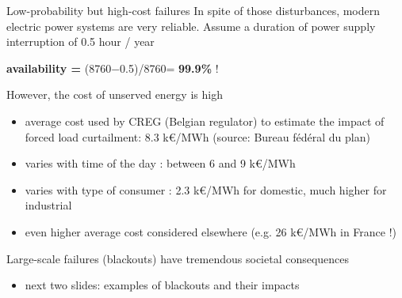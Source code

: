 \begin{frame}[allowframebreaks]{Low-probability but high-cost failures}
In spite of those disturbances, modern electric power systems are very reliable. Assume a duration of power supply interruption of 0.5 hour / year
\begin{center}
\textbf{availability =} (8760$-$0.5)/8760= \textbf{99.9\%} !
\end{center}
However, the cost of unserved energy is high
\begin{itemize}
\item average cost used by CREG (Belgian regulator) to estimate the impact of forced load curtailment: 8.3 k€/MWh (source: Bureau fédéral du plan)
\item varies with time of the day : between 6 and 9 k€/MWh
\item varies with type of consumer : 2.3 k€/MWh for domestic, much higher for industrial
\item even higher average cost considered elsewhere (e.g. 26 k€/MWh in France !)
\end{itemize}
Large-scale failures (blackouts) have tremendous societal consequences
\begin{itemize}
\item next two slides: examples of blackouts and their impacts
\end{itemize}
\end{frame}

